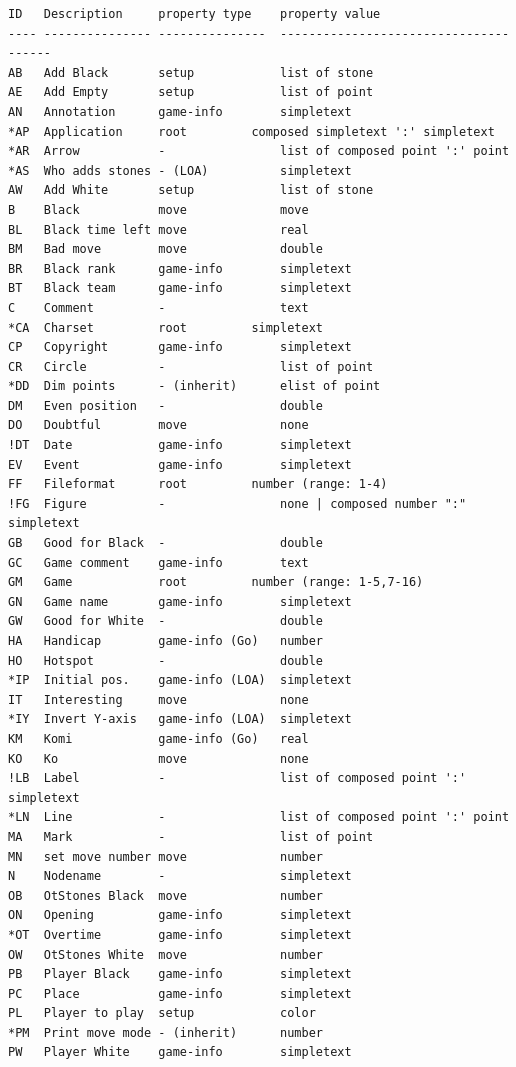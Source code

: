 \begin{verbatim}
ID   Description     property type    property value
---- --------------- ---------------  --------------------------------------
AB   Add Black       setup            list of stone
AE   Add Empty       setup            list of point
AN   Annotation      game-info        simpletext
*AP  Application     root         composed simpletext ':' simpletext
*AR  Arrow           -                list of composed point ':' point
*AS  Who adds stones - (LOA)          simpletext
AW   Add White       setup            list of stone
B    Black           move             move
BL   Black time left move             real
BM   Bad move        move             double
BR   Black rank      game-info        simpletext
BT   Black team      game-info        simpletext
C    Comment         -                text
*CA  Charset         root         simpletext
CP   Copyright       game-info        simpletext
CR   Circle          -                list of point
*DD  Dim points      - (inherit)      elist of point
DM   Even position   -                double
DO   Doubtful        move             none
!DT  Date            game-info        simpletext
EV   Event           game-info        simpletext
FF   Fileformat      root         number (range: 1-4)
!FG  Figure          -                none | composed number ":" simpletext
GB   Good for Black  -                double
GC   Game comment    game-info        text
GM   Game            root         number (range: 1-5,7-16)
GN   Game name       game-info        simpletext
GW   Good for White  -                double
HA   Handicap        game-info (Go)   number
HO   Hotspot         -                double
*IP  Initial pos.    game-info (LOA)  simpletext
IT   Interesting     move             none
*IY  Invert Y-axis   game-info (LOA)  simpletext
KM   Komi            game-info (Go)   real
KO   Ko              move             none
!LB  Label           -                list of composed point ':' simpletext
*LN  Line            -                list of composed point ':' point
MA   Mark            -                list of point
MN   set move number move             number
N    Nodename        -                simpletext
OB   OtStones Black  move             number
ON   Opening         game-info        simpletext
*OT  Overtime        game-info        simpletext
OW   OtStones White  move             number
PB   Player Black    game-info        simpletext
PC   Place           game-info        simpletext
PL   Player to play  setup            color
*PM  Print move mode - (inherit)      number
PW   Player White    game-info        simpletext

\end{verbatim}
